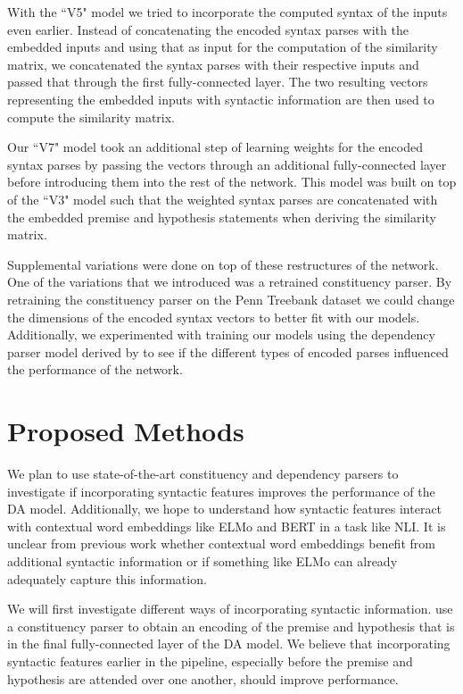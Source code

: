 \documentclass[11pt,a4paper]{article}
\begin{document}
With the ``V5" model we tried to incorporate the computed syntax of the inputs even earlier. Instead of concatenating the encoded syntax parses with the embedded inputs and using that as input for the computation of the similarity matrix, we concatenated the syntax parses with their respective inputs and passed that through the first fully-connected layer. The two resulting vectors representing the embedded inputs with syntactic information are then used to compute the similarity matrix.

Our ``V7" model took an additional step of learning weights for the encoded syntax parses by passing the vectors through an additional fully-connected layer before introducing them into the rest of the network. This model was built on top of the ``V3" model such that the weighted syntax parses are concatenated with the embedded premise and hypothesis statements when deriving the similarity matrix.

Supplemental variations were done on top of these restructures of the network. One of the variations that we introduced was a retrained constituency parser. By retraining the constituency parser on the Penn Treebank dataset \citep{marcus1993building} we could change the dimensions of the encoded syntax vectors to better fit with our models. Additionally, we experimented with training our models using the dependency parser model derived by \citet{dozat2016deep} to see if the different types of encoded parses influenced the performance of the network.

\section{Proposed Methods}
\label{methods}

We plan to use state-of-the-art constituency \citep{Stern2017-co} and
dependency \citep{Dozat2016-gs} parsers to investigate if incorporating
syntactic features improves the performance of the DA model. Additionally, we
hope to understand how syntactic features interact with contextual word
embeddings like ELMo \citep{Peters2018-fz} and BERT \citep{Devlin2018-qc} in a
task like NLI. It is unclear from previous work whether contextual word
embeddings benefit from additional syntactic information or if something like
ELMo can already adequately capture this information.

We will first investigate different ways of incorporating syntactic
information. \citet{Pang2018-syntail} use a constituency parser to obtain an
encoding of the premise and hypothesis that is in the final fully-connected
layer of the DA model. We believe that incorporating syntactic features earlier
in the pipeline, especially before the premise and hypothesis are attended over
one another, should improve performance.
\end{document}

